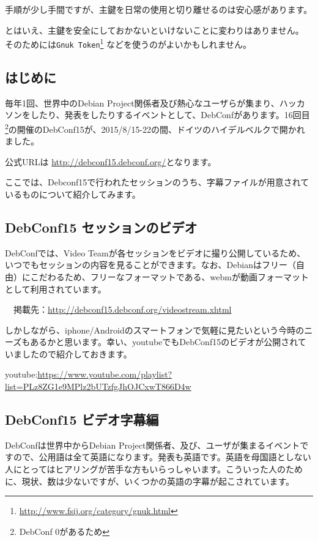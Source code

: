 \documentclass[mingoth,a4paper]{jsarticle}
\begin{document}
手順が少し手間ですが、主鍵を日常の使用と切り離せるのは安心感があります。

とはいえ、主鍵を安全にしておかないといけないことに変わりはありません。
そのためには{\tt Gnuk Token}\footnote{\url{http://www.fsij.org/category/gnuk.html}}
などを使うのがよいかもしれません。


\subsection{はじめに}

 毎年1回、世界中のDebian Project関係者及び熱心なユーザらが集まり、ハッカソンをしたり、発表をしたりするイベントとして、DebConfがあります。16回目\footnote{DebConf 0があるため}の開催のDebConf15が、2015/8/15-22の間、ドイツのハイデルベルクで開かれました。

 公式URLは \url{http://debconf15.debconf.org/}となります。

 ここでは、Debconf15で行われたセッションのうち、字幕ファイルが用意されているものについて紹介してみます。

\subsection{DebConf15 セッションのビデオ}

 DebConfでは、Video Teamが各セッションをビデオに撮り公開しているため、いつでもセッションの内容を見ることができます。なお、Debianはフリー（自由）にこだわるため、フリーなフォーマットである、webmが動画フォーマットとして利用されています。

　掲載先：\url{http://debconf15.debconf.org/videostream.xhtml}

 しかしながら、iphone/Androidのスマートフォンで気軽に見たいという今時のニーズもあるかと思います。幸い、youtubeでもDebConf15のビデオが公開されていましたので紹介しておきます。

 youtube:\url{https://www.youtube.com/playlist?list=PLz8ZG1e9MPlz2bUTzfgJhOJCxwT866D4w}
  
\subsection{DebConf15 ビデオ字幕編}

 DebConfは世界中からDebian Project関係者、及び、ユーザが集まるイベントですので、公用語は全て英語になります。発表も英語です。英語を母国語としない人にとってはヒアリングが苦手な方もいらっしゃいます。こういった人のために、現状、数は少ないですが、いくつかの英語の字幕が起こされています。
\end{document}

